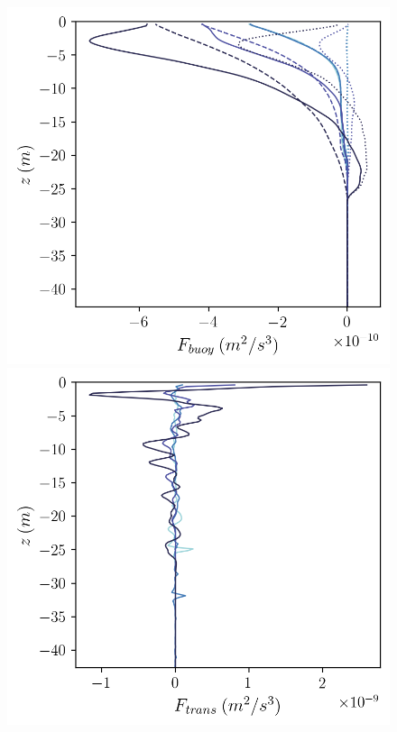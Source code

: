 \documentclass[draft]{agujournal2019}
\begin{document}
\begin{figure}
\begin{minipage}{0.5\textwidth}
    \end{minipage}
    \newline
    \begin{minipage}{0.5\textwidth}
        \includegraphics[trim={0 11cm 0 0},clip,width=\textwidth]{Figures/Fbuoy_cmp_dslope_43h_tav13h_z_profile.png}
    \end{minipage}%
    \begin{minipage}{0.5\textwidth}
        \includegraphics[trim={0 4cm 0 0},clip,width=\textwidth]{Figures/Ftrans_cmp_dslope_43h_tav13h_z_profile.png}

\end{minipage}
\end{figure}
\end{document}
